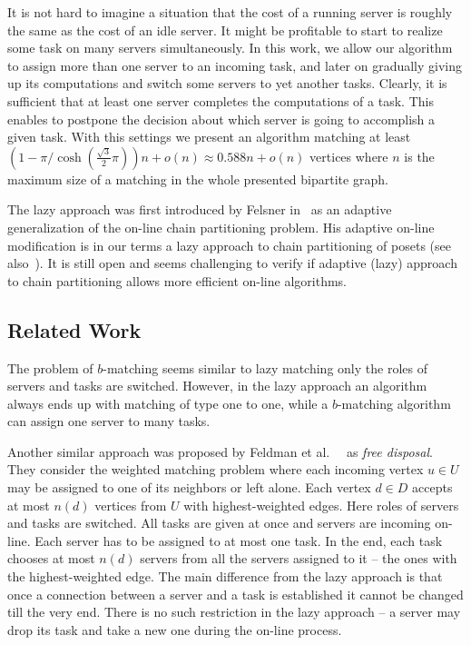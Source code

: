 \documentclass[12pt]{amsart}
\theoremstyle{definition}
\begin{document}
It is not hard to imagine a situation that the cost of a running server is roughly the same as the cost of an idle server. 
It might be profitable to start to realize some task on many servers simultaneously.
In this work, we allow our algorithm to assign more than one server to an incoming task, and later on gradually giving up its computations and switch some servers to yet another tasks.
Clearly, it is sufficient that at least one server completes the computations of a task.
This enables to postpone the decision about which server is going to accomplish a given task. 
With this settings we present an algorithm matching at least $(1-\pi/\cosh(\frac{\sqrt{3}}{2}\pi))n+o(n)\approx 0.588n+o(n)$ vertices where $n$ is the maximum size of a matching in the whole presented bipartite graph.


The lazy approach was first introduced by Felsner in~\cite{Fel97} 
as an adaptive generalization of the on-line chain partitioning problem. 
His adaptive on-line modification is in our terms a lazy approach to chain partitioning of posets (see also~\cite{Kloch07}).
It is still open and seems challenging to verify if adaptive (lazy) approach to chain partitioning allows more efficient on-line algorithms.

\subsection{Related Work}
The problem of $b$-matching seems similar to lazy matching only the roles of servers and tasks are switched. 
However, in the lazy approach an algorithm always ends up with matching of type one to one, while a $b$-matching algorithm can assign one server to many tasks.

Another similar approach was proposed by Feldman et al.\ ~\cite{FMMMa2009} as \emph{free disposal}.
They consider the weighted matching problem where each incoming vertex $u\in U$ may be assigned to one of its neighbors or left alone.
Each vertex $d\in D$ accepts at most $n(d)$ vertices from $U$ with highest-weighted edges.
Here roles of servers and tasks are switched. 
All tasks are given at once and servers are incoming on-line. 
Each server has to be assigned to at most one task. 
In the end, each task chooses at most $n(d)$ servers from all the servers assigned to it  -- the ones with the highest-weighted edge.
The main difference from the lazy approach is that once a connection between a server and a task is established it cannot be changed till the very end.
There is no such restriction in the lazy approach -- a server may drop its task and take a new one during the on-line process.
\end{document}

